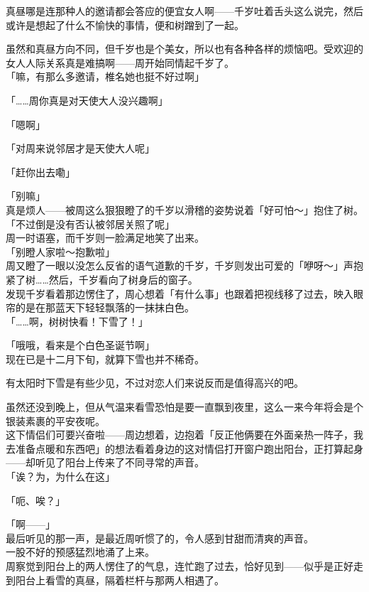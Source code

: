 真昼哪是连那种人的邀请都会答应的便宜女人啊——千岁吐着舌头这么说完，然后或许是想起了什么不愉快的事情，便和树蹭到了一起。

虽然和真昼方向不同，但千岁也是个美女，所以也有各种各样的烦恼吧。受欢迎的女人人际关系真是难搞啊——周开始同情起千岁了。\\

「嘛，有那么多邀请，椎名她也挺不好过啊」

「……周你真是对天使大人没兴趣啊」

「嗯啊」

「对周来说邻居才是天使大人呢」

「赶你出去嘞」

「别嘛」\\

真是烦人——被周这么狠狠瞪了的千岁以滑稽的姿势说着「好可怕～」抱住了树。\\

「不过倒是没有否认被邻居关照了呢」\\

周一时语塞，而千岁则一脸满足地笑了出来。\\

「别瞪人家啦～抱歉啦」\\

周又瞪了一眼以没怎么反省的语气道歉的千岁，千岁则发出可爱的「咿呀～」声抱紧了树……然后，千岁看向了树身后的窗子。\\

发现千岁看着那边愣住了，周心想着「有什么事」也跟着把视线移了过去，映入眼帘的是在那蓝天下轻轻飘落的一抹抹白色。\\

「……啊，树树快看！下雪了！」

「哦哦，看来是个白色圣诞节啊」\\

现在已是十二月下旬，就算下雪也并不稀奇。

有太阳时下雪是有些少见，不过对恋人们来说反而是值得高兴的吧。

虽然还没到晚上，但从气温来看雪恐怕是要一直飘到夜里，这么一来今年将会是个银装素裹的平安夜呢。\\

这下情侣们可要兴奋啦——周边想着，边抱着「反正他俩要在外面亲热一阵子，我去准备点暖和东西吧」的想法看着身边的这对情侣打开窗户跑出阳台，正打算起身——却听见了阳台上传来了不同寻常的声音。\\

「诶？为，为什么在这」

「呃、唉？」

「啊——」\\

最后听见的那一声，是最近周听惯了的，令人感到甘甜而清爽的声音。\\

一股不好的预感猛烈地涌了上来。\\

周察觉到阳台上的两人愣住了的气息，连忙跑了过去，恰好见到——似乎是正好走到阳台上看雪的真昼，隔着栏杆与那两人相遇了。\\
